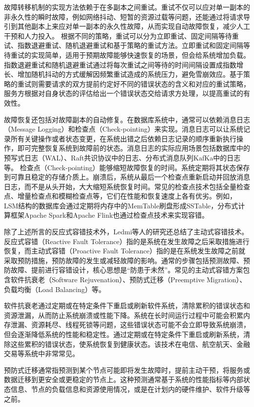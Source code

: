 故障转移机制的实现方法依赖于在多副本之间重试。重试不仅可以应对单一副本的非永久性的瞬时故障，例如网络抖动、短暂的资源过载等问题，还能通过将请求导引到其他副本上来应对单一副本的永久性故障，从而实现自动故障恢复，减少人工干预和人力投入。
根据不同的策略，重试可以分为立即重试、固定间隔等待重试、指数退避重试、随机退避重试和基于策略的重试方法。立即重试和固定间隔等待重试的实现简单，适用于预期故障能够快速恢复的场景，但会给系统增加负载。
指数退避重试和随机退避重试通过将每次重试之间等待的时间间隔设置成指数增长、增加随机抖动的方式缓解因频繁重试造成的系统压力，避免雪崩效应。基于策略的重试则需要请求的双方提前约定好不同的错误状态的含义和对应的重试策略，服务方根据对自身状态的评估给出一个错误状态交给请求方处理，以提高重试的有效性。

故障恢复还包括对故障副本的自动修复。在数据库系统中，通常可以依赖消息日志（Message Logging）和检查点（Check-pointing）来实现。消息日志可以让系统记录所有关键操作或者状态变更，在系统出错之后依赖日志记录的顺序重新执行操作，即可完整恢复系统到故障前的状态。消息日志的实际应用场景包括数据库中的预写式日志（WAL）、Raft共识协议中的日志、分布式消息队列KafKa中的日志等。
检查点（Check-pointing）能够缩短故障恢复的时间。系统定期将其状态保存到可靠且稳定的存储介质上。崩溃后，系统从最后一个检查点重新启动并回放消息日志，而不是从头开始，大大缩短系统恢复时间。常见的检查点技术包括全量检查点、增量检查点和模糊检查点等，它们在性能和恢复速度上各有优劣。例如，LSM结构\cite{o1996lsmtree}的数据库会通过定期将内存中的MemTable刷盘形成SSTable，分布式计算框架Apache Spark\cite{zaharia2016spark}和Apache Flink\cite{carbone2015flink}也通过检查点技术来实现容错。


除了上述所言的反应式容错技术外，Ledmi\cite{ledmi2018fault}等人的研究还总结了主动式容错技术。
反应式容错（Reactive Fault Tolerance）指的是系统在发生故障之后采取措施进行恢复，而主动式容错（Proactive Fault Tolerance）指的是在系统发生故障之前就采取预防措施，预防故障的发生或减轻故障的影响。通常的步骤包括预测故障、预防故障、提前进行容错设计，核心思想是“防患于未然”。常见的主动式容错方案包含软件抗衰老（Software Rejuvenation）、预防式迁移（Preemptive Migration）、负载均衡（Load Balancing）等。

软件抗衰老通过定期或在特定条件下重启或刷新软件系统，清除累积的错误状态和资源泄漏，从而防止系统崩溃或性能下降。系统在长时间运行过程中可能会积累内存泄漏、资源耗尽、线程死锁等问题，这些错误状态可能不会立即导致系统崩溃，但会逐渐降低系统的性能和稳定性。通过定期或在特定条件下重启或刷新系统，清除这些累积的错误状态，使系统恢复到健康状态。该技术在电信、航空航天、金融交易等系统中非常常见。

预防式迁移通常指预测到某个节点可能即将发生故障时，提前主动干预，将服务或数据迁移到更安全或更稳定的节点上。这种预测通常基于系统的性能指标等内部状态信息、节点的负载信息和资源使用情况，或是在计划内的硬件维护、软件升级等之前。

